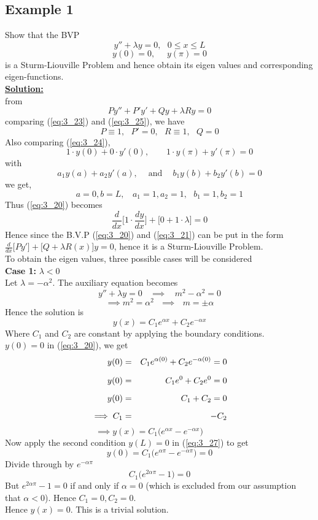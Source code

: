 \documentclass[12pt]{report}
\newcommand{\bt}[1]{\textbf{#1}}
\newcommand{\ubt}[1]{\textbf{\underline{#1}}}
\newcommand{\sps}{\\[0.2cm]}
\newcommand{\refn}[1]{(\ref{#1})}
\newcommand{\refx}[1]{\refn{eq:#1}}
\newcommand{\NI}{\noindent}
\newcommand{\dsp}{\displaystyle}
\newcommand{\sprime}{'}
\newcommand{\dprime}{''}
\begin{document}
	\subsection*{Example 1}
	Show that the BVP
	\begin{equation}
		y\dprime + \lambda y = 0, ~~~ 0 \leq x \leq L \label{eq:3_23}
	\end{equation}
	\begin{equation}
		y(0) = 0, ~~~~~~ y(\pi) = 0 \label{eq:3_24}
	\end{equation}
	is a Sturm-Liouville Problem and hence obtain its eigen values and corresponding eigen-functions.\sps
	\ubt{Solution:}\sps
	from
	\begin{equation}
		Py\dprime + P\sprime y\sprime + Qy + \lambda Ry = 0 \label{eq:3_25}
	\end{equation}
	comparing \refx{3_23} and \refx{3_25}, we have
	$$
		P\equiv 1, ~~~ P\sprime = 0, ~~~ R \equiv 1, ~~~ Q=0
	$$
	Also comparing \refx{3_24},
	$$
		1 \cdot y(0) + 0 \cdot y\sprime(0), ~~~~~~~~~ 1\cdot y(\pi) + y\sprime(\pi) = 0 
	$$
	with
	$$
		a_1y(a) + a_2y\sprime(a), ~~~~\text{ and }~~~~ b_1y(b) + b_2y\sprime(b) = 0 
	$$
	we get,
	$$
		a=0, b=L,~~~~ a_1=1, a_2 = 1, ~~~ b_1=1, b_2 = 1
	$$
	Thus \refx{3_20} becomes
	$$
		\frac{d}{dx}\Big[1\cdot \frac{dy}{dx}\Big] + \Big[0 + 1\cdot\lambda\Big] = 0 
	$$
	Hence since the B.V.P \refx{3_20} and \refx{3_21} can be put in the form $\dsp \frac{d}{dx}\Big[Py\sprime\Big] + \Big[Q + \lambda R(x)\Big]y = 0$, hence it is a Sturm-Liouville Problem.\sps
	
	\NI To obtain the eigen values, three possible cases will be considered\sps
	\bt{Case 1:} $\lambda < 0$\sps
	Let $\lambda = - \alpha^2$. The auxiliary equation becomes
	$$
		y\dprime + \lambda y= 0 ~~~~ \implies ~~~~ m^2 - \alpha^2 = 0
	$$
	$$
		\implies m^2 = \alpha^2 ~~~\implies ~~~ m = \pm \alpha
	$$
	Hence the solution is 
	\begin{equation}
		y(x) = C_1 e^{\alpha x} + C_2 e^{-\alpha x} \label{eq:3_26}
	\end{equation}
	Where $C_1$ and $C_2$ are constant by applying the boundary conditions.\\
	$y(0) = 0$ in \refx{3_20}, we get\sps
	\begin{eqnarray}
		y(0) &=& C_1e^{\alpha(0)} + C_2 e^{-\alpha(0)} = 0 \notag\sps
		y(0) &=& C_1 e^0 + C_2 e^0 = 0\notag \sps
		y(0) &=& C_1 + C_2 = 0\notag\sps
		\implies C_1 &=& -C_2\notag
	\end{eqnarray}
	\begin{equation}
		\implies y(x) = C_1\Big(e^{\alpha x} - e^{-\alpha x}\Big) \label{eq:3_27}~~~~~~~~~~~
	\end{equation}
	Now apply the second condition $y(L) = 0$ in \refx{3_27} to get
	$$
		y(0) = C_1\Big(e^{\alpha \pi} - e^{-\alpha \pi}\Big) = 0
	$$
	Divide through by $e^{-\alpha \pi}$
	\begin{equation}
		C_1\Big(e^{2\alpha \pi} - 1\Big) = 0 \label{eq:3_28}
	\end{equation}
	But $\dsp e^{2\alpha \pi} - 1 = 0 $ if and only if $\alpha =0$ (which is excluded from our assumption that $\alpha < 0$). Hence $C_1 = 0, C_2=0$.\sps
	Hence $y(x) = 0$. This is a trivial solution.\sps
	
\end{document}
